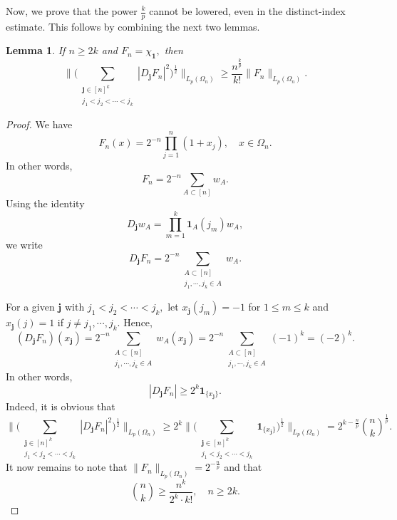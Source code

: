 \documentclass{amsart}
\numberwithin{equation}{section}
\newtheorem{lem}[thm]{Lemma}
\theoremstyle{definition}
\theoremstyle{remark}
\newcommand{\1}{\mathbf 1}
\begin{document}
Now, we prove that the power $\frac{k}{p}$ cannot be lowered, even in the distinct-index estimate. This follows by combining the next two lemmas.
\begin{lem} If $n\geq 2k$ and $F_n=\chi_{\mathbf{1}},$  then
$$\Big\|\Big(
 \sum_{\substack{\mathbf j\in [n]^k\\
 j_1<j_2<\cdots<j_k}}
 |D_{\mathbf j}F_n|^{2}
\Big)^{\frac12}
\Big\|_{L_p(\Omega_n)}
 \geq \frac{n^{\frac{k}{p}}}{k!}\|F_n\|_{L_p(\Omega_n)}.$$
\end{lem}
\begin{proof} We have
$$F_n(x)=2^{-n}\prod_{j=1}^n(1+x_j),\quad x\in\Omega_n.$$
In other words,
$$F_n=2^{-n}\sum_{A\subset [n]}w_A.$$
Using the identity
$$D_{\mathbf{j}}w_A=\prod_{m=1}^k\1_A(j_m) w_A,$$
we write
$$D_{\mathbf{j}}F_n=2^{-n}\sum_{\substack{A\subset [n]\\ j_1,\cdots,j_k\in A}}w_A.$$

\noindent For a given $\mathbf{j}$ with $j_1<j_2<\cdots<j_k,$ let $x_{\mathbf{j}}(j_m)=-1$ for $1\leq m\leq k$ and $x_{\mathbf{j}}(j)=1$ if $j\neq j_1,\cdots,j_k.$ Hence,
$$(D_{\mathbf{j}}F_n)(x_{\mathbf{j}})=2^{-n}\sum_{\substack{A\subset [n]\\ j_1,\cdots,j_k\in A}}w_A(x_{\mathbf{j}})=2^{-n}\sum_{\substack{A\subset [n]\\ j_1,\cdots,j_k\in A}}(-1)^k=(-2)^k.$$
In other words,
$$|D_{\mathbf{j}}F_n|\geq 2^k\1_{\{x_{\mathbf{j}}\}}.$$
Indeed, it is obvious that
$$\Big\|\Big(
 \sum_{\substack{\mathbf j\in [n]^{k}\\
 j_1<j_2<\cdots<j_k}}
 |D_{\mathbf j}F_n|^{2}
\Big)^{\frac12}
\Big\|_{L_p(\Omega_n)}\geq 2^k\Big\|\Big(
 \sum_{\substack{\mathbf j\in [n]^{k}\\
 j_1<j_2<\cdots<j_k}}\1_{\{x_{\mathbf{j}}\}}\Big)^{\frac12}\Big\|_{L_p(\Omega_n)}=2^{k-\frac{n}{p}}\binom{n}{k}^{\frac1p}.$$
It now remains to note that $\|F_{n}\|_{L_p(\Omega_n)}=2^{-\frac{n}{p}}$ and that
$$\binom{n}{k}\geq \frac{n^k}{2^k\cdot k!},\quad n\geq 2k.$$
\end{proof}
\end{document}
